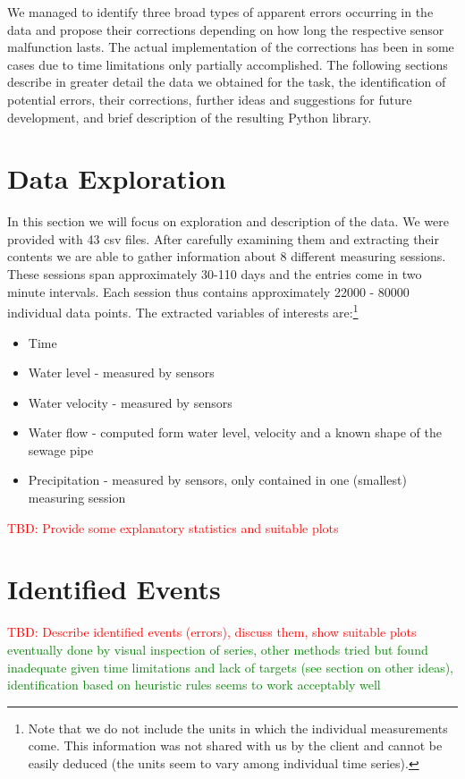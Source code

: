 \documentclass[12pt,a4paper]{article}
\begin{document}
We managed to identify three broad types of apparent errors occurring in the data and propose their corrections depending on how long the respective sensor malfunction lasts. The actual implementation of the corrections has been in some cases  due to time limitations only partially accomplished. The following sections describe in greater detail the data we obtained for the task, the identification of potential errors, their corrections, further ideas and suggestions for future development, and brief description of the resulting Python library. 


\newpage
\section{Data Exploration}
In this section we will focus on exploration and description of the data. We were provided with 43 csv files. After carefully examining them and extracting their contents we are able to gather information about 8 different measuring sessions. These sessions span approximately 30-110 days and the entries come in two minute intervals. Each session thus contains approximately 22000 - 80000 individual data points. The extracted variables of interests are:\footnote{Note that we do not include the units in which the individual measurements come. This information was not shared with us by the client and cannot be easily deduced (the units seem to vary among individual time series).}
\begin{itemize}
    \item Time
    \item Water level - measured by sensors
    \item Water velocity - measured by sensors
    \item Water flow - computed form water level, velocity and a known shape of the sewage pipe
    \item Precipitation - measured by sensors, only contained in one (smallest) measuring session
\end{itemize}


\textcolor{red}{TBD: Provide some explanatory statistics and suitable plots}




\newpage
\section{Identified Events}

\textcolor{red}{TBD: Describe identified events (errors), discuss them, show suitable plots}
\textcolor{green}{eventually done by visual inspection of series, other methods tried but found inadequate given time limitations and lack of targets (see section on other ideas),  identification based on heuristic rules seems to work acceptably well}\\
\end{document}
